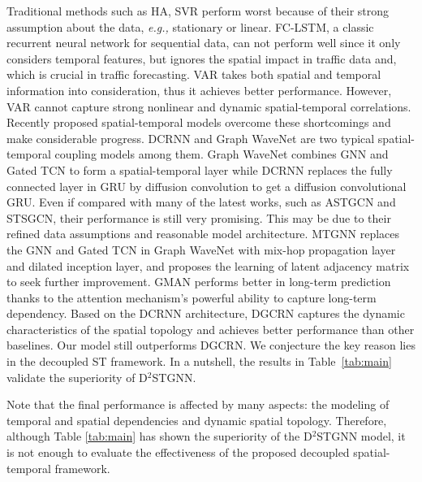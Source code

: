 \documentclass[sigconf, nonacm]{acmart}
\newcommand{\eg}{\textit{e.g.,}\xspace}
\begin{document}
Traditional methods such as HA, SVR perform worst because of their strong assumption about the data, \eg stationary or linear. 
FC-LSTM, a classic recurrent neural network for sequential data, can not perform well since it only considers temporal features, but ignores the spatial impact in traffic data and, which is crucial in traffic forecasting.
VAR takes both spatial and temporal information into consideration, thus it achieves better performance.
However, VAR cannot capture strong nonlinear and dynamic spatial-temporal correlations. 
{\color{black} Recently proposed spatial-temporal models overcome these shortcomings and make considerable progress. DCRNN and Graph WaveNet are two typical spatial-temporal coupling models among them.}
Graph WaveNet combines GNN and Gated TCN to form a spatial-temporal layer while DCRNN replaces the fully connected layer in GRU by diffusion convolution to get a diffusion convolutional GRU.
Even if compared with many of the latest works, such as ASTGCN and STSGCN, their performance is still very promising. 
This may be due to their refined data assumptions and reasonable model architecture.
MTGNN replaces the GNN and Gated TCN in Graph WaveNet with mix-hop propagation layer~\cite{2019MixHop} and dilated inception layer, and proposes the learning of latent adjacency matrix to seek further improvement.
GMAN performs better in long-term prediction thanks to the attention mechanism's powerful ability to capture long-term dependency.
{\color{black} Based on the DCRNN architecture, DGCRN captures the dynamic characteristics of the spatial topology and achieves better performance than other baselines.
Our model still outperforms DGCRN. We conjecture the key reason lies in the decoupled ST framework.
}
In a nutshell, the results in Table~\ref{tab:main} validate the superiority of D$^2$STGNN.

Note that the final performance is affected by many aspects: the modeling of temporal and spatial dependencies and dynamic spatial topology.
Therefore, although Table \ref{tab:main} has shown the superiority of the D$^2$STGNN model, it is not enough to evaluate the effectiveness of the {\color{black}proposed} decoupled spatial-temporal framework. 
\end{document}
